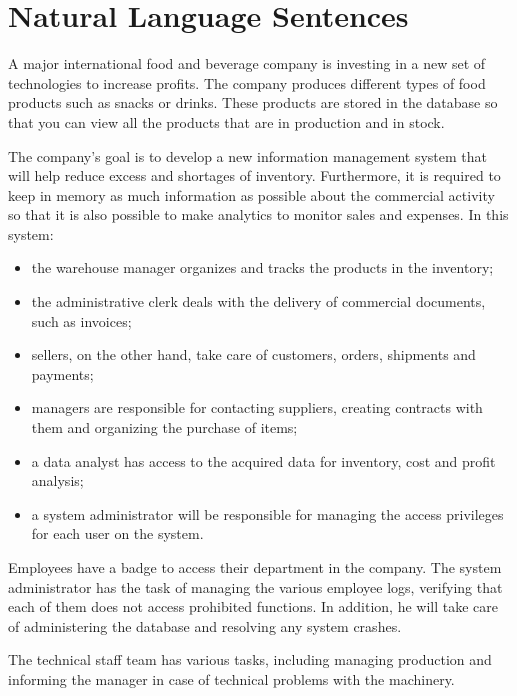\section{Natural Language Sentences}

A major international food and beverage company is investing in a new set of technologies to increase profits.
The company produces different types of food products such as snacks or drinks. These products are stored in the database so that you can view all the products that are in production and in stock.

The company's goal is to develop a new information management system that will help reduce excess and shortages of inventory. Furthermore, it is required to keep in memory as much information as possible about the commercial activity so that it is also possible to make analytics to monitor sales and expenses. In this system:
\begin{itemize}
    \item the warehouse manager organizes and tracks the products in the inventory;
    \item the administrative clerk deals with the delivery of commercial documents, such as invoices;
    \item sellers, on the other hand, take care of customers, orders, shipments and payments;
    \item managers are responsible for contacting suppliers, creating contracts with them and organizing the purchase of items;
    \item a data analyst has access to the acquired data for inventory, cost and profit analysis;
    \item a system administrator will be responsible for managing the access privileges for each user on the system.
\end{itemize}

Employees have a badge to access their department in the company. The system administrator has the task of managing the various employee logs, verifying that each of them does not access prohibited functions. In addition, he will take care of administering the database and resolving any system crashes.

The technical staff team has various tasks, including managing production and informing the manager in case of technical problems with the machinery.

